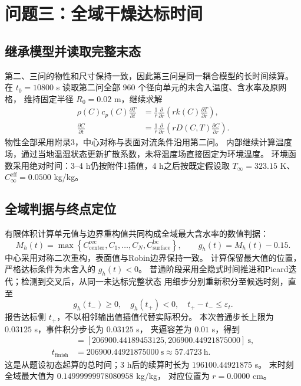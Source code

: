 \section{问题三：全域干燥达标时间}

\subsection{继承模型并读取完整末态}
第二、三问的物性和尺寸保持一致，因此第三问是同一耦合模型的长时间续算。
在 $t_0=10800$ s 读取第二问全部 $960$ 个径向单元的未舍入温度、含水率及原网格，
维持固定半径 $R_0=0.02$ m，继续求解
\begin{align}
\rho(C)c_p(C)\frac{\partial T}{\partial t}&=
\frac1r\frac{\partial}{\partial r}\left(rk(C)\frac{\partial T}{\partial r}\right),\\
\frac{\partial C}{\partial t}&=
\frac1r\frac{\partial}{\partial r}\left(rD(C,T)\frac{\partial C}{\partial r}\right).
\end{align}
物性全部采用附录3，中心对称与表面对流条件沿用第二问。
内部继续计算温度场，通过当地温湿状态更新扩散系数，未将温度场直接固定为环境温度。
环境函数采用绝对时间：3--4 h仍按附件1插值，4 h之后按既定假设取
$T_\infty=323.15$ K、$C_\infty^{\mathrm{eff}}=0.0500$ kg/kg。

\subsection{全域判据与终点定位}
有限体积计算单元值与边界重构值共同构成全域最大含水率的数值判据：
\begin{equation}
M_h(t)=\max\left\{C_{\mathrm{center}}^{\mathrm{rec}},C_1,\ldots,C_N,
C_{\mathrm{surface}}^{\mathrm{bc}}\right\},\qquad
g_h(t)=M_h(t)-0.15.
\end{equation}
中心采用对称二次重构，表面值与Robin边界保持一致。
计算保留最大值的位置，严格达标条件为未舍入的 $g_h(t)<0$。
普通阶段采用全隐式时间推进和Picard迭代；检测到交叉后，从同一未达标完整状态
用细步分别重新积分至候选时刻，直至
\begin{equation}
g_h(t_-)\ge0,\quad g_h(t_+)<0,\quad t_+-t_-\le\varepsilon_t.
\end{equation}
报告达标侧 $t_+$，不以相邻输出值插值代替实际积分。
本次普通步长上限为 $0.03125$ s，事件积分步长为 $0.03125$ s，
夹逼容差为 $0.01$ s，得到
\begin{align}
[t_-,t_+]&=[206900.44189453125,206900.44921875000]\ \mathrm{s},\\
t_{\mathrm{finish}}&=206900.44921875000\ \mathrm{s}
\approx 57.4723\ \mathrm{h}.
\end{align}
这是从题设初态起算的总时间；3 h后的续算时长为 $196100.44921875$ s。
末时刻全域最大值为 $0.14999999978080958$ kg/kg，
对应位置为 $r=0.0000$ cm。

